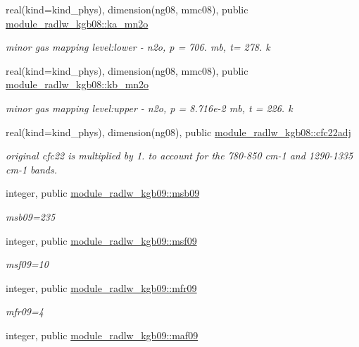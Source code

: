\begin{Indent}
\begin{DoxyCompactItemize}
real(kind=kind\+\_\+phys), dimension(ng08, mmc08), public \hyperlink{group__module__radlw__kgbnn_ga61949dc331e9a58d4f2a31b625481795}{module\+\_\+radlw\+\_\+kgb08\+::ka\+\_\+mn2o}
\begin{DoxyCompactList}\small\item\em minor gas mapping level\+:lower -\/ n2o, p = 706. mb, t= 278. k \end{DoxyCompactList}\item 
real(kind=kind\+\_\+phys), dimension(ng08, mmc08), public \hyperlink{group__module__radlw__kgbnn_ga9a8e2f789421acc307e37b03478efb4b}{module\+\_\+radlw\+\_\+kgb08\+::kb\+\_\+mn2o}
\begin{DoxyCompactList}\small\item\em minor gas mapping level\+:upper -\/ n2o, p = 8.\+716e-\/2 mb, t = 226. k \end{DoxyCompactList}\item 
real(kind=kind\+\_\+phys), dimension(ng08), public \hyperlink{group__module__radlw__kgbnn_ga38a3ce7d8f3db6b732511cf78ef735db}{module\+\_\+radlw\+\_\+kgb08\+::cfc22adj}
\begin{DoxyCompactList}\small\item\em original cfc22 is multiplied by 1. to account for the 780-\/850 cm-\/1 and 1290-\/1335 cm-\/1 bands. \end{DoxyCompactList}\item 
integer, public \hyperlink{group__module__radlw__kgbnn_ga7e6bb7acb0df29586d0bd52f3fc41d90}{module\+\_\+radlw\+\_\+kgb09\+::msb09}
\begin{DoxyCompactList}\small\item\em msb09=235 \end{DoxyCompactList}\item 
integer, public \hyperlink{group__module__radlw__kgbnn_ga7d728ef04b3f26c6b20149084334be5a}{module\+\_\+radlw\+\_\+kgb09\+::msf09}
\begin{DoxyCompactList}\small\item\em msf09=10 \end{DoxyCompactList}\item 
integer, public \hyperlink{group__module__radlw__kgbnn_ga777f63022c4f7187446945c6e6ba77e7}{module\+\_\+radlw\+\_\+kgb09\+::mfr09}
\begin{DoxyCompactList}\small\item\em mfr09=4 \end{DoxyCompactList}\item 
integer, public \hyperlink{group__module__radlw__kgbnn_ga7d5d565c87af7ef07dc17930f9cb9e57}{module\+\_\+radlw\+\_\+kgb09\+::maf09}

\end{DoxyCompactItemize}
\end{Indent}
